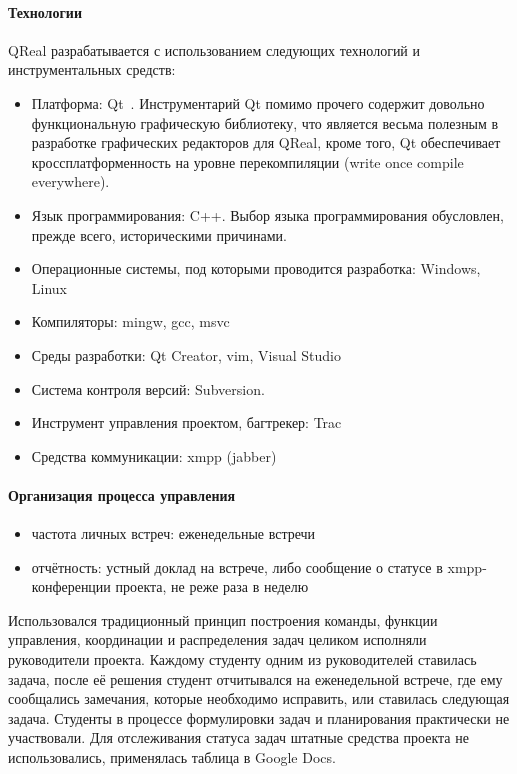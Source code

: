 \documentclass[a5paper]{article}
\begin{document}
\paragraph{Технологии}
QReal разрабатывается с использованием следующих технологий и инструментальных средств:
\begin{itemize}
	\item Платформа: Qt~\cite{qt}. Инструментарий Qt помимо прочего содержит довольно функциональную графическую библиотеку, что является весьма полезным в разработке графических редакторов для QReal, кроме того, Qt обеспечивает кроссплатформенность на уровне перекомпиляции (write once compile everywhere).
	\item Язык программирования: C++. Выбор языка программирования обусловлен, прежде всего, историческими причинами.
	\item Операционные системы, под которыми проводится разработка: Windows, Linux
	\item Компиляторы: mingw, gcc, msvc
	\item Среды разработки: Qt Creator, vim, Visual Studio
	\item Система контроля версий: Subversion.
	\item Инструмент управления проектом, багтрекер: Trac
	\item Средства коммуникации: xmpp (jabber)
\end{itemize}

\paragraph{Организация процесса управления}
\begin{itemize}
	\item частота личных встреч: еженедельные встречи
	\item отчётность: устный доклад на встрече, либо сообщение о статусе в xmpp-конференции проекта, не реже раза в неделю
\end{itemize}

Использовался традиционный принцип построения команды, функции управления, координации и распределения задач целиком исполняли руководители проекта. Каждому студенту одним из руководителей ставилась задача, после её решения студент отчитывался на еженедельной встрече, где ему сообщались замечания, которые необходимо исправить, или ставилась следующая задача. Студенты в процессе формулировки задач и планирования практически не участвовали. Для отслеживания статуса задач штатные средства проекта не использовались, применялась таблица в Google Docs.
\end{document}
